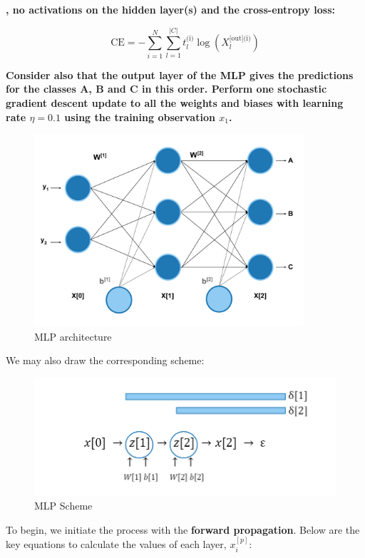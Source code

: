 \documentclass[12pt]{article}
\begin{document}
\begin{enumerate}
\textbf{, no activations on the hidden layer(s) and the cross-entropy loss:}

\begin{equation}\label{eq:CE}
    \text{CE} = -\sum_{i=1}^{N}\sum_{l=1}^{|C|} t_{l}^{\text{(i)}} \log(X_{l}^{\text{[out](i)}})
\end{equation}

\textbf{Consider also that the output layer of the MLP gives the predictions for the classes A, B and C in this order. Perform one
stochastic gradient descent update to all the weights and biases with learning rate $\eta = 0.1$
using the training observation $x_1$.}

\begin{figure}[H]
    \centering
    \includegraphics[width=10cm]{./Part I/MLP_corrected.pdf}
    \caption{MLP architecture}
\end{figure}

\vspace{10pt}
We may also draw the corresponding scheme:
\begin{figure}[H]
    \centering
    \includegraphics[width=12cm]{./Part I/Scheme.png}
    \caption{MLP Scheme}
\end{figure}

To begin, we initiate the process with the \textbf{forward propagation}. Below are the key equations to calculate the values of each
layer, $x^{[p]}_i$:


\end{enumerate}
\end{document}
